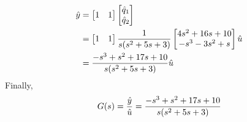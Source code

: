 \documentclass[12pt,a4paper]{article}
\begin{document}
\begin{align*}
	\hat y &= \begin{bmatrix}
		1 & 1
	\end{bmatrix} \begin{bmatrix}
		\hat q_1 \\ \hat q_2
	\end{bmatrix} \\
	&=\begin{bmatrix}
		1 & 1
	\end{bmatrix}  {1\over s(s^2 + 5s+ 3)} 	\begin{bmatrix}
	4s^2+16s+10 \\
	-s^3-3s^2+s
	\end{bmatrix}\hat u \\
	&=  { -s^3 + s^2 + 17s + 10 \over s(s^2 + 5s+ 3)} \hat u 
\end{align*}
Finally, 
\[
G(s) = {\hat y \over \hat u} =  { -s^3 + s^2 + 17s + 10 \over s(s^2 + 5s+ 3)}
\]

\vspace{8cm}
\end{document}
